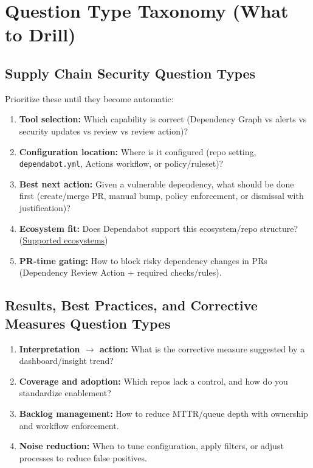 \documentclass[11pt]{article}
\begin{document}
\section{Question Type Taxonomy (What to Drill)}
\subsection{Supply Chain Security Question Types}\label{sec:qtypes-supply}
Prioritize these until they become automatic:

\begin{enumerate}
  \item \textbf{Tool selection:} Which capability is correct (Dependency Graph vs alerts vs security updates vs review vs review action)?
  \item \textbf{Configuration location:} Where is it configured (repo setting, \texttt{dependabot.yml}, Actions workflow, or policy/ruleset)?
  \item \textbf{Best next action:} Given a vulnerable dependency, what should be done first (create/merge PR, manual bump, policy enforcement, or dismissal with justification)?
  \item \textbf{Ecosystem fit:} Does Dependabot support this ecosystem/repo structure? (\href{https://docs.github.com/en/code-security/reference/supply-chain-security/supported-ecosystems-and-repositories}{Supported ecosystems})
  \item \textbf{PR-time gating:} How to block risky dependency changes in PRs (Dependency Review Action + required checks/rules).
\end{enumerate}

\subsection{Results, Best Practices, and Corrective Measures Question Types}\label{sec:qtypes-results}
\begin{enumerate}
  \item \textbf{Interpretation $\rightarrow$ action:} What is the corrective measure suggested by a dashboard/insight trend?
  \item \textbf{Coverage and adoption:} Which repos lack a control, and how do you standardize enablement?
  \item \textbf{Backlog management:} How to reduce MTTR/queue depth with ownership and workflow enforcement.
  \item \textbf{Noise reduction:} When to tune configuration, apply filters, or adjust processes to reduce false positives.
\end{enumerate}
\end{document}
